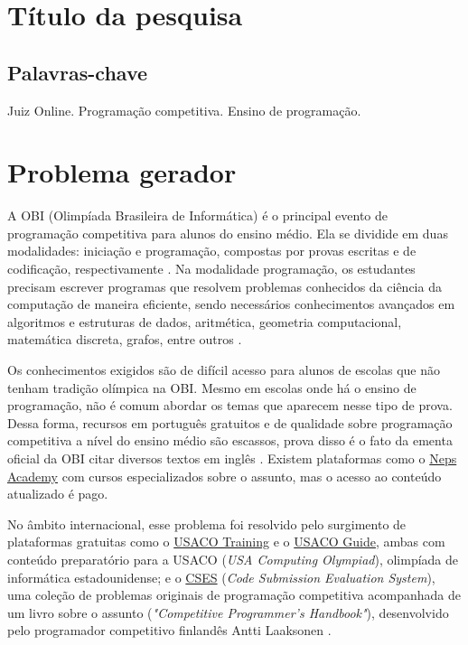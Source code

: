 \documentclass[oneside,12pt,article,a4paper,english,brazil]{abntex2}
\begin{document}
\section{Título da pesquisa}
\thetitle

\subsection{Palavras-chave}
Juiz Online. Programação competitiva. Ensino de programação.

\section{Problema gerador}

A OBI (Olimpíada Brasileira de Informática) é o principal evento de programação competitiva para alunos do ensino médio. Ela se dividide em duas modalidades: iniciação e programação, compostas por provas escritas e de codificação, respectivamente \cite{obi-info}. Na modalidade programação, os estudantes precisam escrever programas que resolvem problemas conhecidos da ciência da computação de maneira eficiente, sendo necessários conhecimentos avançados em algoritmos e estruturas de dados, aritmética, geometria computacional, matemática discreta, grafos, entre outros \cite{obi-ementa} \cite{ioi-syllabus}.

Os conhecimentos exigidos são de difícil acesso para alunos de escolas que não tenham tradição olímpica na OBI. Mesmo em escolas onde há o ensino de programação, não é comum abordar os temas que aparecem nesse tipo de prova. Dessa forma, recursos em português gratuitos e de qualidade sobre programação competitiva a nível do ensino médio são escassos, prova disso é o fato da ementa oficial da OBI citar diversos textos em inglês \cite{obi-ementa}. Existem plataformas como o \href{https://neps.academy}{Neps Academy} com cursos especializados sobre o assunto, mas o acesso ao conteúdo atualizado é pago.

No âmbito internacional, esse problema foi resolvido pelo surgimento de plataformas gratuitas como o \href{https://train.usaco.org/}{USACO Training} \cite{usaco-ioi} e o \href{https://usaco.guide}{USACO Guide}, ambas com conteúdo preparatório para a USACO (\emph{USA Computing Olympiad}), olimpíada de informática estadounidense; e o \href{https://cses.fi/}{CSES} (\emph{Code Submission Evaluation System}), uma coleção de problemas originais de programação competitiva acompanhada de um livro sobre o assunto (\emph{"Competitive Programmer's Handbook"}), desenvolvido pelo programador competitivo finlandês Antti Laaksonen \cite{cses-ioi}.
\end{document}
